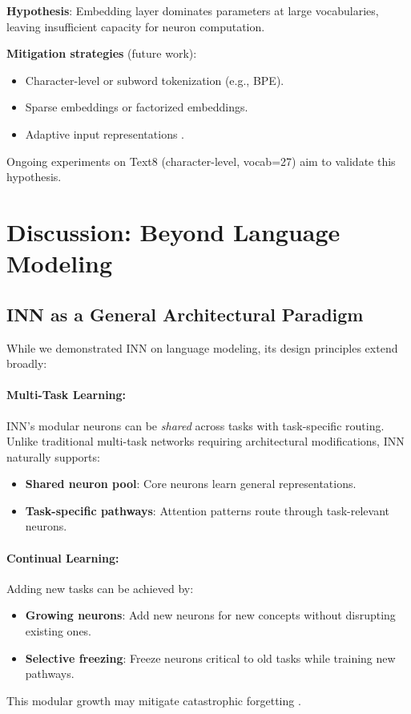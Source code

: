 \documentclass{article}
\begin{document}
\textbf{Hypothesis}: Embedding layer dominates parameters at large vocabularies, leaving insufficient capacity for neuron computation.

\textbf{Mitigation strategies} (future work):
\begin{itemize}
    \item Character-level or subword tokenization (e.g., BPE).
    \item Sparse embeddings or factorized embeddings.
    \item Adaptive input representations \cite{baevski2018adaptive}.
\end{itemize}

Ongoing experiments on Text8 (character-level, vocab=27) aim to validate this hypothesis.

\section{Discussion: Beyond Language Modeling}

\subsection{INN as a General Architectural Paradigm}

While we demonstrated INN on language modeling, its design principles extend broadly:

\paragraph{Multi-Task Learning:}
INN's modular neurons can be \emph{shared} across tasks with task-specific routing. Unlike traditional multi-task networks requiring architectural modifications, INN naturally supports:
\begin{itemize}
    \item \textbf{Shared neuron pool}: Core neurons learn general representations.
    \item \textbf{Task-specific pathways}: Attention patterns route through task-relevant neurons.
\end{itemize}

\paragraph{Continual Learning:}
Adding new tasks can be achieved by:
\begin{itemize}
    \item \textbf{Growing neurons}: Add new neurons for new concepts without disrupting existing ones.
    \item \textbf{Selective freezing}: Freeze neurons critical to old tasks while training new pathways.
\end{itemize}
This modular growth may mitigate catastrophic forgetting \cite{french1999catastrophic}.
\end{document}
